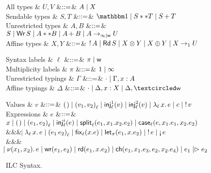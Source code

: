 \begin{figure*}[t]
  \centering
  \begin{minipage}{.58\textwidth}
    \centering
    \begin{grammar}
        All types
      & $U, V$
        &$\bnfas$& $A \bnfalt X$
      \\
      Sendable types
      & $S, T$
      &$\bnfas$& $\tyUnit \bnfalt S ** T \bnfalt \tySum{S}{}{T}$
      \\
      Unrestricted types
      & $A,B$
      &$\bnfas$& $S \bnfalt \tyWr{S} \bnfalt A ** B \bnfalt \tySum{A}{}{B}
      \bnfalt \tyArr{A}{\infty \mid \wm}{U}$
      \\
      Affine types
      & $X,Y$
      &$\bnfas$& $\tyBang{A} \bnfalt \tyRd{S} \bnfalt \tyTensor{X}{Y} \bnfalt
      \tyOplus{X}{Y} \bnfalt \tyArr{X}{1}{U}$
    \end{grammar}      
  \end{minipage}%
  \begin{minipage}{.42\textwidth}
    \centering
    \begin{grammar}
      Syntax labels
      & $\ell$
      &$\bnfas$& $\pi \bnfalt \wm$      
      \\      
      Multiplicity labels
      & $\pi$
      &$\bnfas$& $1 \bnfalt \infty$      
      \\
      Unrestricted typings
      & $\Gamma$
      &$\bnfas$& $\emptyctxt \bnfalt \Gamma,x:A$
      \\
      Affine typings
      & $\Delta$
      &$\bnfas$& $\emptyctxt \bnfalt \Delta,x:X \bnfalt \Delta, \wrtok$
    \end{grammar}    
  \end{minipage}
  \begin{grammar}
    Values
    & $v$
    &$\bnfas$&
    $\eUnit \bnfalt \ePair{v_1}{v_2}{\ell} \bnfalt \eInjj{\ell}{1}{v} \bnfalt
    \eInjj{\ell}{2}{v} \bnfalt \eLamm{\ell}{x}{e} \bnfalt c \bnfalt \eBang{v}$
    \\
    Expressions
    & $e$
    &$\bnfas$&
    $\eVar{x} \bnfalt \eUnit \bnfalt \ePair{e_1}{e_2}{\ell} \bnfalt \eInjj{\ell}{i}{e}
    \bnfalt \eSplitt{\ell}{e_1}{x_1}{x_2}{e_2} \bnfalt
    \eCase{\ell}{e}{x_1}{e_1}{x_2}{e_2}$
    \\ &&& $\bnfaltbrk \eLamm{\ell}{x}{e} \bnfalt \eApp{e_1}{e_2}{\ell} \bnfalt \eFixx{\ell}{x}{e}
    \bnfalt \eLet{x}{e_1}{e_2} \bnfalt \eBang{e} \bnfalt \eUnbang{e}$
    \\ &&& $\bnfaltbrk \eNu{(x_1,x_2)}{e} \bnfalt \eWr{e_1}{e_2} \bnfalt
    \eLetRd{e_1}{x}{e_2} \bnfalt \eChoicee{e_1}{x_1}{e_3}{e_2}{x_2}{e_4} \bnfalt
    \eFork{e_1}{e_2}$
  \end{grammar}      
  \caption{ILC Syntax.}
  \label{fig:ilc-syntax}
\end{figure*}
